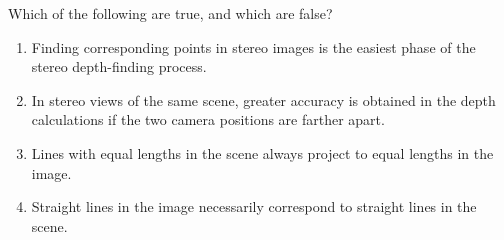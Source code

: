 \begin{iexercise}
Which of the following are true, and which are false?
\begin{enumerate}
\item Finding corresponding points in stereo images is the easiest phase of
the stereo depth-finding process.
\item In stereo views of the same scene, greater accuracy is obtained in the
depth calculations if the two camera positions are farther apart.
\item  Lines with equal lengths in the scene  always project to equal
lengths in the image.
\item  Straight lines in the image necessarily correspond to straight lines 
in the scene.
\end{enumerate}
\end{iexercise} 










